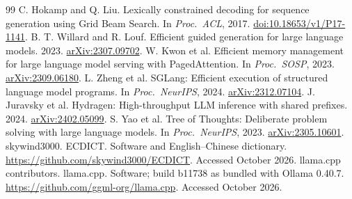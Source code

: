 \documentclass[11pt,a4paper]{article}
\begin{document}
\begin{thebibliography}{99}
 C. Hokamp and Q. Liu. Lexically constrained decoding for sequence generation using Grid Beam Search. In \emph{Proc.\ ACL}, 2017. \href{https://doi.org/10.18653/v1/P17-1141}{doi:10.18653/v1/P17-1141}.
 B. T. Willard and R. Louf. Efficient guided generation for large language models. 2023. \href{https://arxiv.org/abs/2307.09702}{arXiv:2307.09702}.
 W. Kwon et al. Efficient memory management for large language model serving with PagedAttention. In \emph{Proc.\ SOSP}, 2023. \href{https://arxiv.org/abs/2309.06180}{arXiv:2309.06180}.
 L. Zheng et al. SGLang: Efficient execution of structured language model programs. In \emph{Proc.\ NeurIPS}, 2024. \href{https://arxiv.org/abs/2312.07104}{arXiv:2312.07104}.
 J. Juravsky et al. Hydragen: High-throughput LLM inference with shared prefixes. 2024. \href{https://arxiv.org/abs/2402.05099}{arXiv:2402.05099}.
 S. Yao et al. Tree of Thoughts: Deliberate problem solving with large language models. In \emph{Proc.\ NeurIPS}, 2023. \href{https://arxiv.org/abs/2305.10601}{arXiv:2305.10601}.
 skywind3000. ECDICT. Software and English--Chinese dictionary. \url{https://github.com/skywind3000/ECDICT}. Accessed October 2026.
 llama.cpp contributors. llama.cpp. Software; build b11738 as bundled with Ollama 0.40.7. \url{https://github.com/ggml-org/llama.cpp}. Accessed October 2026.
\end{thebibliography}
\endgroup
\end{document}

